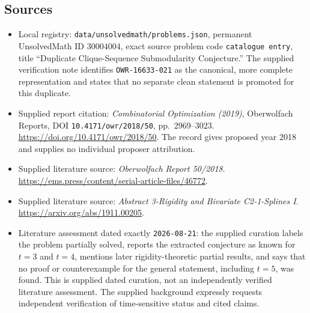 \documentclass[11pt]{article}
\begin{document}
\subsection{Sources}
\begin{itemize}
\item Local registry: \texttt{data/unsolvedmath/problems.json}, permanent UnsolvedMath ID \(30004004\), exact source problem code \texttt{catalogue entry}, title ``Duplicate Clique-Sequence Submodularity Conjecture.'' The supplied verification note identifies \texttt{OWR-16633-021} as the canonical, more complete representation and states that no separate clean statement is promoted for this duplicate.
\item Supplied report citation: \emph{Combinatorial Optimization (2019)}, Oberwolfach Reports, DOI \texttt{10.4171/owr/2018/50}, pp.\ 2969--3023. \url{https://doi.org/10.4171/owr/2018/50}. The record gives proposed year 2018 and supplies no individual proposer attribution.
\item Supplied literature source: \emph{Oberwolfach Report 50/2018}. \url{https://ems.press/content/serial-article-files/46772}.
\item Supplied literature source: \emph{Abstract 3-Rigidity and Bivariate C2-1-Splines I}. \url{https://arxiv.org/abs/1911.00205}.
\item Literature assessment dated exactly \texttt{2026-08-21}: the supplied curation labels the problem partially solved, reports the extracted conjecture as known for \(t=3\) and \(t=4\), mentions later rigidity-theoretic partial results, and says that no proof or counterexample for the general statement, including \(t=5\), was found. This is supplied dated curation, not an independently verified literature assessment. The supplied background expressly requests independent verification of time-sensitive status and cited claims.
\end{itemize}
\end{document}
